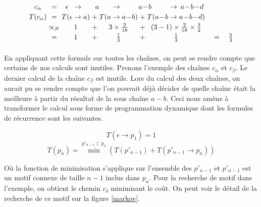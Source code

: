 \documentclass[12pt,french,twoside]{report}
\begin{document}
\[
\arraycolsep=1.4pt\def\arraystretch{1.2}
\begin{array}{cccccccccccccc}
  c_\alpha    & =  & \epsilon &  \rightarrow &  \multicolumn{3}{c}{a} & \rightarrow & \multicolumn{3}{c}{a\!-\!b} &  \rightarrow & \multicolumn{1}{c}{a\!-\!b\!-\!d} &\\
  T(c_\alpha)   & =  & T( \epsilon &  \rightarrow &  a)  & + & T( a &  \rightarrow  & a\!-\!b) & + & T(a\!-\!b &  \rightarrow & a\!-\!b\!-\!d) &\\
                    & \propto_{N}  &  \multicolumn{3}{c}{1} &  + & \multicolumn{3}{c}{3 \times \frac{2}{18}} & + & \multicolumn{3}{c}{  (3-1)\times \frac{2}{18} \times \frac{3}{2}} &\\
                    & = &  \multicolumn{3}{c}{1} &  + & \multicolumn{3}{c}{\frac{1}{3}} & + & \multicolumn{3}{c}{\frac{1}{3}}   & \quad= \quad\frac{5}{3} \\

\end{array}
\]

\paragraph{}En appliquant cette formule sur toutes les chaînes, on peut se rendre compte que certains de nos calculs sont inutiles.
Prenons l'exemple des chaînes $c_{\alpha}$ et $c_{\beta}$. Le dernier calcul de la chaîne $c_{\beta}$ est inutile. Lors
du calcul des deux chaînes, on aurait pu se rendre compte que l'on pouvait déjà décider de quelle chaîne était la meilleure à
partir du résultat de la sous chaîne $a-b$. Ceci nous amène à transformer le calcul sous forme de programmation dynamique dont les
formules de récurrence sont les suivantes.


\begin{equation}
 T(\epsilon \rightarrow p_1) = 1
\end{equation}
\begin{equation}
 T(p_n) = \min^{p'_{n-1} \subset p_n} (T(p'_{n-1}) + T(p'_{n-1} \rightarrow p_n))
\end{equation}

Où la fonction de minimisation s'applique sur l'ensemble des $p'_{n-1}$ et $p'_{n-1}$ est un motif connexe de taille $n-1$ inclus
dans $p_n$. Pour la recherche de motif dans l'exemple, on obtient le chemin $c_{\delta}$ minimisant le coût. On peut voir le
détail de la recherche de ce motif sur la figure \ref{markov}.
\end{document}
